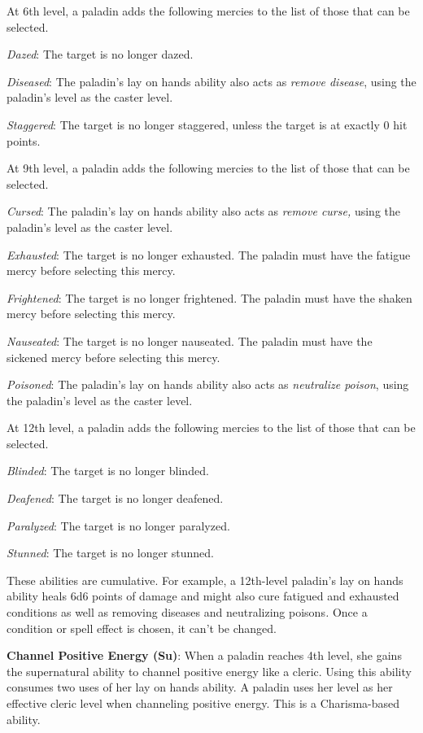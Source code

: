 At 6th level, a paladin adds the following mercies to the list of those that can be selected. 
				
\textit{Dazed}: The target is no longer dazed.
				
\textit{Diseased}: The paladin's lay on hands ability also acts as \textit{remove disease}, using the paladin's level as the caster level.
				
\textit{Staggered}: The target is no longer staggered, unless the target is at exactly 0 hit points.
				
At 9th level, a paladin adds the following mercies to the list of those that can be selected.
				
\textit{Cursed}: The paladin's lay on hands ability also acts as \textit{remove curse,} using the paladin's level as the caster level.
				
\textit{Exhausted}: The target is no longer exhausted. The paladin must have the fatigue mercy before selecting this mercy.
				
\textit{Frightened}: The target is no longer frightened. The paladin must have the shaken mercy before selecting this mercy.
				
\textit{Nauseated}: The target is no longer nauseated. The paladin must have the sickened mercy before selecting this mercy.
				
\textit{Poisoned}: The paladin's lay on hands ability also acts as \textit{neutralize poison}, using the paladin's level as the caster level.
				
At 12th level, a paladin adds the following mercies to the list of those that can be selected.
				
\textit{Blinded}: The target is no longer blinded.
				
\textit{Deafened}: The target is no longer deafened.
				
\textit{Paralyzed}: The target is no longer paralyzed.
				
\textit{Stunned}: The target is no longer stunned. 
				
These abilities are cumulative. For example, a 12th-level paladin's lay on hands ability heals 6d6 points of damage and might also cure fatigued and exhausted conditions as well as removing diseases and neutralizing poisons\textit{. }Once a condition or spell effect is chosen, it can't be changed.
				
\textbf{Channel Positive Energy (Su)}: When a paladin reaches 4th level, she gains the supernatural ability to channel positive energy like a cleric. Using this ability consumes two uses of her lay on hands ability. A paladin uses her level as her effective cleric level when channeling positive energy. This is a Charisma-based ability.
				
